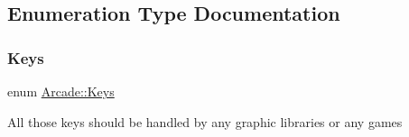 \subsection{Enumeration Type Documentation}
\mbox{\label{namespace_arcade_a9b501908b20bc993e4f8226db5323c41}} 
\subsubsection{\texorpdfstring{Keys}{Keys}}
{\footnotesize\ttfamily enum \hyperlink{namespace_arcade_a9b501908b20bc993e4f8226db5323c41}{Arcade\+::\+Keys}}

All those keys should be handled by any graphic libraries or any games 